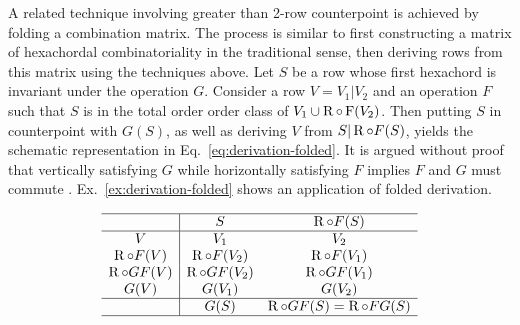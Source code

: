 A related technique involving greater than 2-row counterpoint is achieved by folding a combination matrix. The process is similar to first constructing a matrix of hexachordal combinatoriality in the traditional sense, then deriving rows from this matrix using the techniques above. Let $S$ be a row whose first hexachord is invariant under the operation $G$. Consider a row $V = V_1 | V_2$ and an operation $F$ such that $S$ is in the total order order class of $V_1 \cup \operatorname{R} \circ \operatorname{F}(V_2)$. Then putting $S$ in counterpoint with $G(S)$, as well as deriving $V$ from $S | \operatorname{R}\circ F(S)$, yields the schematic representation in Eq.~\ref{eq:derivation-folded}. It is argued without proof that vertically satisfying $G$ while horizontally satisfying $F$ implies $F$ and $G$ must commute \cite[215]{Starr1984}. Ex.~\ref{ex:derivation-folded} shows an application of folded derivation.

\begin{equation}
\begin{array}{c|cc}
	\hline
	& S & \operatorname{R} \circ F(S) \\
	\hline
	V & V_1 & V_2 \\
	\operatorname{R} \circ F(V) & \operatorname{R} \circ F(V_2) & \operatorname{R} \circ F(V_1) \\
	\operatorname{R} \circ GF(V) & \operatorname{R} \circ GF(V_2) & \operatorname{R} \circ GF(V_1) \\
	G(V) & G(V_1) & G(V_2) \\
	\hline
	& G(S) & \operatorname{R} \circ GF(S) = \operatorname{R} \circ FG(S) \\
	\hline 
\end{array}
\label{eq:derivation-folded}
\end{equation}

\vspace{12pt}

